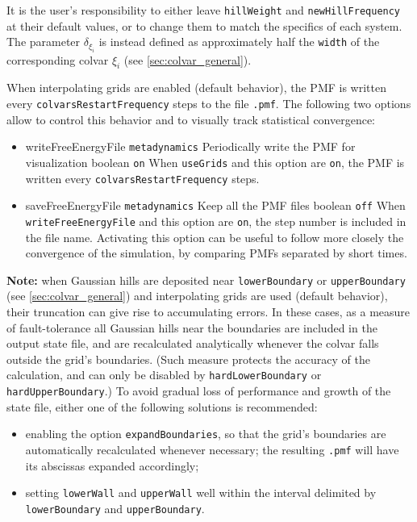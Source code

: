 It is the user's responsibility to either leave \texttt{hillWeight} and \texttt{newHillFrequency} at their default values, or to change them to match the specifics of each system.
The parameter $\delta_{\xi_{i}}$ is instead defined as approximately half the \texttt{width} of the corresponding colvar $\xi_{i}$ (see \ref{sec:colvar_general}).



\label{sec:colvarbias_meta_output}
When interpolating grids are enabled (default behavior), the PMF is written every \texttt{colvarsRestartFrequency} steps to the file \outputName\texttt{.pmf}.
The following two options allow to control this behavior and to visually track statistical convergence:

\begin{itemize}

\item %
  \keydef
    {writeFreeEnergyFile}{%
    \texttt{metadynamics}}{%
    Periodically write the PMF for visualization}{%
    boolean}{%
    \texttt{on}}{%
    When \texttt{useGrids} and this option are \texttt{on}, the PMF is
    written every \texttt{colvarsRestartFrequency} steps.}

\item %
  \keydef
    {saveFreeEnergyFile}{%
    \texttt{metadynamics}}{%
    Keep all the PMF files}{%
    boolean}{%
    \texttt{off}}{%
    When \texttt{writeFreeEnergyFile} and this option are \texttt{on},
    the step number is included in the file name.  Activating this
    option can be useful to follow more closely the convergence of the
    simulation, by comparing PMFs separated by short times.}

\end{itemize}

\textbf{Note:} when Gaussian hills are deposited near \texttt{lowerBoundary} or \texttt{upperBoundary} (see \ref{sec:colvar_general}) and interpolating grids are used (default behavior), their truncation can give rise to accumulating errors.
In these cases, as a measure of fault-tolerance all Gaussian hills near the boundaries are included in the output state file, and are recalculated analytically whenever the colvar falls outside the grid's boundaries.
(Such measure protects the accuracy of the calculation, and can only be disabled by \texttt{hardLowerBoundary} or \texttt{hardUpperBoundary}.)
To avoid gradual loss of performance and growth of the state file, either one of the following solutions is recommended:
\begin{itemize}
\item enabling the option \texttt{expandBoundaries}, so that the grid's boundaries are automatically recalculated whenever necessary; the resulting \texttt{.pmf} will have its abscissas expanded accordingly;
\item setting \texttt{lowerWall} and \texttt{upperWall} well within the interval delimited by \texttt{lowerBoundary} and \texttt{upperBoundary}.
\end{itemize}


